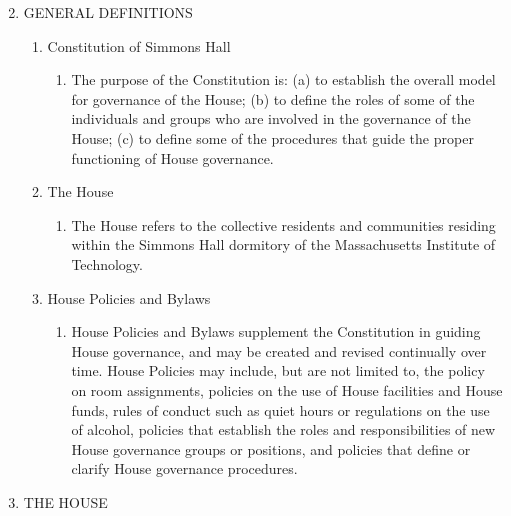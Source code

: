 \documentclass[letterpaper]{article}
\begin{document}
\begin{enumerate}
\setcounter{enumi}{1} %
\item GENERAL DEFINITIONS 

\begin{enumerate}

\item Constitution of Simmons Hall 

\begin{enumerate}

\item The purpose of the Constitution is: (a) to establish the overall model for governance of the House; (b) to define the roles of some of the individuals and groups who are involved in the governance of the House; (c) to define some of the procedures that guide the proper functioning of House governance.

\end{enumerate}

\item The House 

\begin{enumerate}

\item The House refers to the collective residents and communities residing within the Simmons Hall dormitory of the Massachusetts Institute of Technology. 

\end{enumerate}

\item House Policies and Bylaws

\begin{enumerate}

\item House Policies and Bylaws supplement the Constitution in guiding House governance, and may be created and revised continually over time. House Policies may include, but are not limited to, the policy on room assignments, policies on the use of House facilities and House funds, rules of conduct such as quiet hours or regulations on the use of alcohol, policies that establish the roles and responsibilities of new House governance groups or positions, and policies that define or clarify House governance procedures.

\end{enumerate}

\end{enumerate}

\item THE HOUSE 


\end{enumerate}
\end{document}
